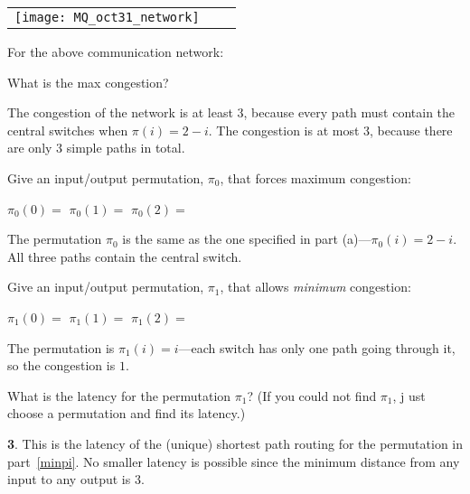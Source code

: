 \begin{center}
\begin{tabular}{ccc}
\texttt{[image: MQ\_oct31\_network]}\\
\end{tabular}
\end{center}

\begin{problem}[4] For the above communication network:

\bparts

\ppart[1] What is the max congestion? \hfill \examrule{0.5in}

\begin{solution}
The congestion of the network is at least 3,
  because every path must contain the central switches when $\pi(i) = 2 -
  i$.  The congestion is at most 3, because there are only 3 simple paths
  in total.
\end{solution}

\ppart[1] Give an input/output permutation, $\pi_0$, that forces maximum
  congestion:

\hfill $\pi_0(0) =$ \brule{0.4in}  \qquad $\pi_0(1) =$ \brule{0.4in}
\qquad $\pi_0(2) =$ \brule{0.4in}

\begin{solution}
The permutation $\pi_0$ is the same as the one specified in
  part (a)---$\pi_0(i) = 2-i$.  All three paths contain the central
  switch. 
\end{solution}

\ppart[1]\label{minpi} Give an input/output permutation, $\pi_1$, that
allows \emph{minimum} congestion:

\hfill $\pi_1(0) =$ \brule{0.4in}  \qquad $\pi_1(1) =$ \brule{0.4in}
\qquad $\pi_1(2) =$ \brule{0.4in}

\begin{solution}
The permutation is $\pi_1(i) = i$---each switch has only
one path going through it, so the congestion is $1$.
\end{solution}


\ppart[1] What is the latency for the permutation $\pi_1$? (If you could not find $\pi_1$, j
ust choose a permutation and find its latency.)
\hfill\examrule{0.5in}

\begin{solution}
\textbf{3}.  This is the latency of
  the (unique) shortest path routing for the permutation in
  part~\eqref{minpi}.  No smaller latency is possible since the minimum
  distance from any input to any output is 3.
\end{solution}
\eparts




\end{problem}
